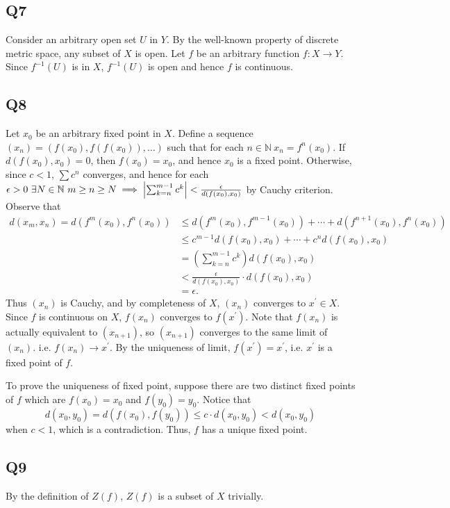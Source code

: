 \documentclass[12pt,lettersize]{article}
\newcommand{\N}{\mathbb{N}}
\begin{document}
	\subsection*{Q7}
	Consider an arbitrary open set $U$ in $Y$. By the well-known property of discrete metric space, any subset of $X$ is open. Let $f$ be an arbitrary function $f:X\rightarrow Y$. Since $f^{-1}(U)$ is in $X$, $f^{-1}(U)$ is open and hence $f$ is continuous.
	\newpage
	
	\subsection*{Q8}
	Let $x_0$ be an arbitrary fixed point in $X$. Define a sequence $(x_n)=(f(x_0),f(f(x_0)),\dots)$ such that for each $n\in\N\ x_n=f^n(x_0)$. If $d(f(x_0),x_0)=0$, then $f(x_0)=x_0$, and hence $x_0$ is a fixed point. Otherwise, since $c<1$, $\sum c^n$ converges, and hence for each $\epsilon>0\ \exists N\in\N\ m\geq n\geq N\implies\abs{\sum_{k=n}^{m-1}c^k}<\frac{\epsilon}{d(f(x_0),x_0)}$ by Cauchy criterion. Observe that
	\begin{align*}
		d(x_m,x_n)=d(f^m(x_0),f^n(x_0))&\leq d(f^m(x_0),f^{m-1}(x_0))+\cdots+d(f^{n+1}(x_0),f^n(x_0))\\
									   &\leq c^{m-1}d(f(x_0),x_0)+\cdots+c^nd(f(x_0),x_0)\\
									   &= \left(\sum_{k=n}^{m-1}c^k\right)d(f(x_0),x_0)\\
									   &< \frac{\epsilon}{d(f(x_0),x_0)}\cdot d(f(x_0),x_0)\\
									   &= \epsilon.
	\end{align*}
	Thus $(x_n)$ is Cauchy, and by completeness of $X$, $(x_n)$ converges to $x^\prime\in X$. Since $f$ is continuous on $X$, $f(x_n)$ converges to $f(x^\prime)$. Note that $f(x_n)$ is actually equivalent to $(x_{n+1})$, so $(x_{n+1})$ converges to the same limit of $(x_n)$. i.e. $f(x_n)\rightarrow x^\prime$. By the uniqueness of limit, $f(x^\prime)=x^\prime$, i.e. $x^\prime$ is a fixed point of $f$.\smallskip
	
	To prove the uniqueness of fixed point, suppose there are two distinct fixed points of $f$ which are $f(x_0)=x_0$ and $f(y_0)=y_0$. Notice that
	\begin{displaymath}
		d(x_0,y_0)=d(f(x_0),f(y_0))\leq c\cdot d(x_0,y_0)<d(x_0,y_0)
	\end{displaymath}
	when $c<1$, which is a contradiction. Thus, $f$ has a unique fixed point.
	\newpage
	
	\subsection*{Q9}
	By the definition of $Z(f)$, $Z(f)$ is a subset of $X$ trivially.\smallskip
	
\end{document}
